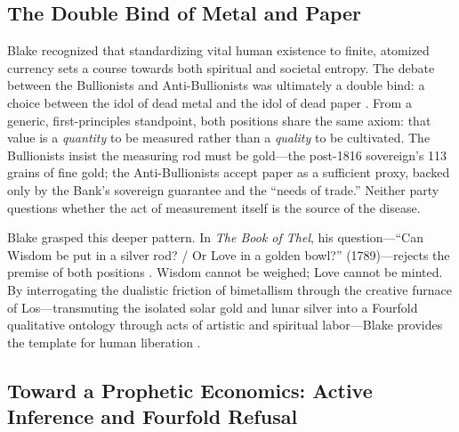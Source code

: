 \documentclass[
]{article}
\begin{document}
\subsection{The Double Bind of Metal and
Paper}\label{the-double-bind-of-metal-and-paper}

Blake recognized that standardizing vital human existence to finite,
atomized currency sets a course towards both spiritual and societal
entropy. The debate between the Bullionists and Anti-Bullionists was
ultimately a double bind: a choice between the idol of dead metal and
the idol of dead paper \citep{thornton1802nature, ricardo1810high}. From
a generic, first-principles standpoint, both positions share the same
axiom: that value is a \emph{quantity} to be measured rather than a
\emph{quality} to be cultivated. The Bullionists insist the measuring
rod must be gold---the post-1816 sovereign's 113 grains of fine gold;
the Anti-Bullionists accept paper as a sufficient proxy, backed only by
the Bank's sovereign guarantee and the ``needs of trade.'' Neither party
questions whether the act of measurement itself is the source of the
disease.

Blake grasped this deeper pattern. In \emph{The Book of Thel}, his
question---``Can Wisdom be put in a silver rod? / Or Love in a golden
bowl?'' (1789)---rejects the premise of both positions
\citep{blake1789thel}. Wisdom cannot be weighed; Love cannot be minted.
By interrogating the dualistic friction of bimetallism through the
creative furnace of Los---transmuting the isolated solar gold and lunar
silver into a Fourfold qualitative ontology through acts of artistic and
spiritual labor---Blake provides the template for human liberation
\citep{erdman1988complete, thompson1993witness}.

\subsection{Toward a Prophetic Economics: Active Inference and Fourfold
Refusal}\label{toward-a-prophetic-economics-active-inference-and-fourfold-refusal}
\end{document}
